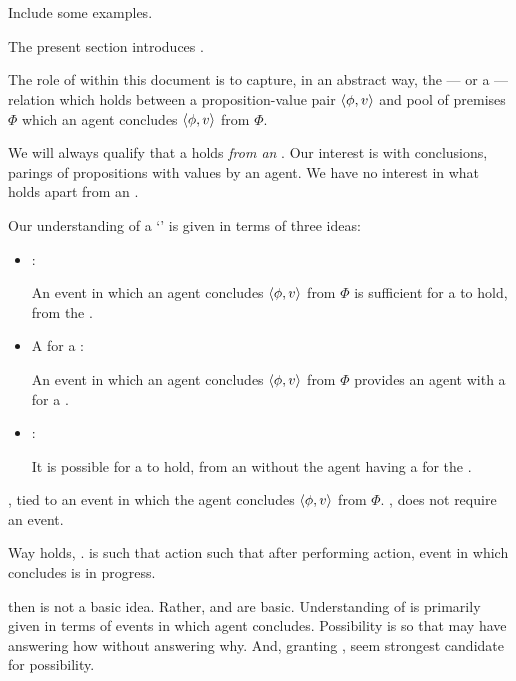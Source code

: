 \section{}
\label{cha:var:ros}

{
  \color{red} Include some examples.
}

\begin{note}
  The present section introduces \ros{}.

  The role of  within this document is to capture, in an abstract way, the --- or a --- relation which holds between a proposition-value pair \(\langle \phi, v \rangle\) and pool of premises \(\Phi\) which an agent concludes \(\langle \phi, v \rangle\) from \(\Phi\).
\end{note}

\begin{note}
  We will always qualify that a \ros{} holds \emph{from an \agpe{}}.
  Our interest is with conclusions, parings of propositions with values by an agent.
  We have no interest in what holds apart from an \agpe{}.
\end{note}

\begin{note}
  Our understanding of a `' is given in terms of three ideas:

  \begin{itemize}
  \item
    \supportI{}:

    An event in which an agent concludes \(\langle \phi, v \rangle\) from \(\Phi\) is sufficient for a \ros{} to hold, from the \agpe{}.
  \item
    A \wit{} for a \ros{}:

    An event in which an agent concludes \(\langle \phi, v \rangle\) from \(\Phi\) provides an agent with a  for a \ros{}.
  \item
    \supportII{}:

    It is possible for a \ros{} to hold, from an \agpe{} without the agent having a \wit{} for the \ros{}.
  \end{itemize}

  \supportI{}, tied to an event in which the agent concludes \(\langle \phi, v \rangle\) from \(\Phi\).
  \supportII{}, does not require an event.

  Way holds, .
  \fc{} is such that action such that after performing action, event in which concludes is in progress.

  \fc{} then \ros{} is not a basic idea.
  Rather, \supportI{} and \supportII{} are basic.
  Understanding of \ros{} is primarily given in terms of events in which agent concludes.
  Possibility is so that may have \ros{} answering how without answering why.
  And, granting \supportII{},  seem strongest candidate for possibility.
\end{note}

